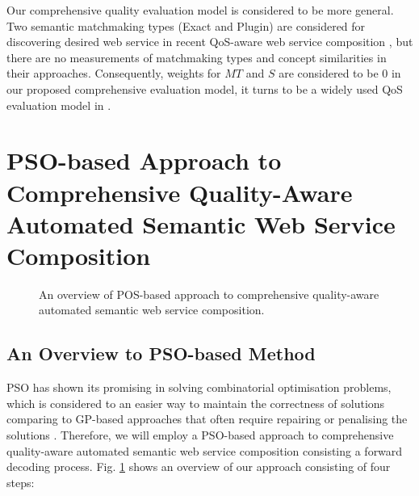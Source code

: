 \documentclass{llncs}
\begin{document}
Our comprehensive quality evaluation model is considered to be more general. Two semantic matchmaking types (Exact and Plugin) are considered for discovering desired web service in recent QoS-aware web service composition  \cite{ma2015hybrid,da2016particle,da2015graphevol}, but there are no measurements of matchmaking types and concept similarities in their approaches. Consequently, weights for $MT$ and $S$ are considered to be 0 in our proposed comprehensive evaluation model, it turns to be a widely used QoS evaluation model in \cite{ma2015hybrid,da2016particle,da2015graphevol}.


\section{PSO-based Approach to Comprehensive Quality-Aware Automated Semantic Web Service Composition}\label{qswsc_approach}

\begin{figure}[h]
\centering
{}
 \caption{An overview of POS-based approach to comprehensive quality-aware automated semantic web service composition.}
 \label{overview}
\end{figure}


\subsection{An Overview to PSO-based Method}\label{PSO_based_approach}

PSO has shown its promising in solving combinatorial optimisation problems, which is considered to an easier way to maintain the correctness of solutions comparing to GP-based approaches that often require repairing or penalising the solutions \cite{da2016particle}. Therefore, we will employ a PSO-based approach to comprehensive quality-aware automated semantic web service composition consisting a forward decoding process. Fig. \ref{overview} shows an overview of our approach consisting of four steps:
\end{document}
